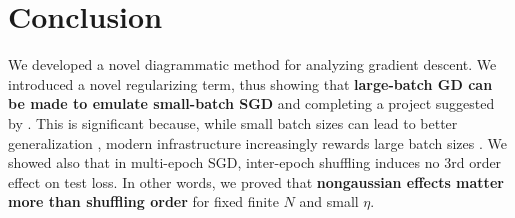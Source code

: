 \documentclass{article}
\begin{document}

\section{Conclusion}


    We developed a novel diagrammatic method for analyzing gradient descent.
    We introduced a novel regularizing term, thus showing that {\bf large-batch
    GD can be made to emulate small-batch SGD} and completing a project
    suggested by \citet{ro18}.  This is significant because, while small batch
    sizes can lead to better generalization \citep{bo91}, modern infrastructure
    increasingly rewards large batch sizes \citep{go18}.  We showed also that
    in multi-epoch SGD, inter-epoch shuffling induces no $3$rd order effect
    on test loss.  In other words, we proved that {\bf nongaussian effects
    matter more than shuffling order} for fixed finite $N$ and small $\eta$.

\end{document}
